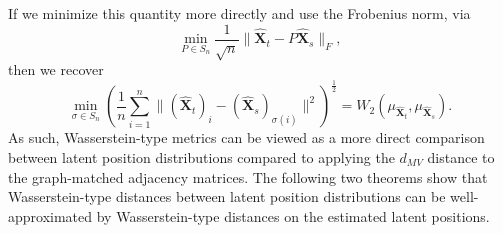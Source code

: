\documentclass[12pt]{article}
\newcommand{\RR}{\mathbb{R}}
\newcommand{\EE}{\mathbb{E}}
\theoremstyle{definition}
\newtheorem{definition}{Definition}
\newcommand{\bX}{\mathbf{X}}
\newcommand{\bY}{\mathbf{Y}}
\begin{document}
If we minimize this quantity more directly and use the Frobenius norm, via 
$$
\min_{P \in S_n}\frac{1}{\sqrt{n}}\| \hat{\bX}_t - P\hat{\bX}_s\|_F,$$
then we recover
$$\min_{\sigma \in S_n} \left(\frac{1}{n} \sum^n_{i=1} \| (\hat{\bX}_t)_i - (\hat{\bX}_s)_{\sigma(i)}\|^2\right)^{\frac{1}{2}} = W_2(\mu_{\hat{\bX}_t}, \mu_{\hat{\bX}_s} ).
$$
As such, Wasserstein-type metrics can be viewed as a more direct comparison between latent position distributions compared to applying the $d_{MV}$ distance to the graph-matched adjacency matrices. The following two theorems show that Wasserstein-type distances between latent position distributions can be well-approximated by Wasserstein-type distances on the estimated latent positions.






\end{document}
